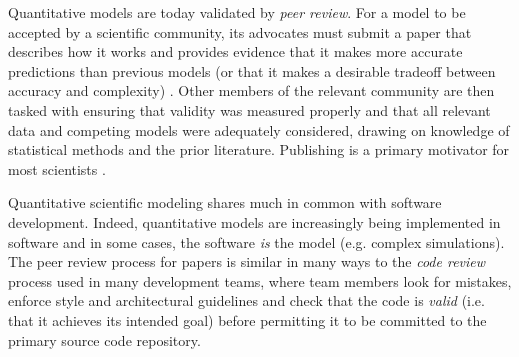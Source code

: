 \documentclass[9pt]{sig-alternate}
\begin{document}
Quantitative models are today validated by \emph{peer review}. For a model to be accepted by a scientific community, its advocates must submit a paper that describes how it works and provides evidence that it makes more accurate predictions than previous models (or that it makes a desirable tradeoff  between accuracy and complexity) \cite{box1987empirical}. Other members of the relevant community are then tasked with ensuring that validity was measured properly and that all relevant data and competing models were adequately considered, drawing on knowledge of statistical methods and the prior literature. Publishing is a primary motivator for most scientists \cite{howison2011scientific}.

Quantitative scientific modeling shares much in common with software development. Indeed, quantitative models are increasingly being implemented in software and in some cases, the software \emph{is} the model (e.g. complex simulations). The peer review process for papers is similar in many ways to the \emph{code review} process used in many development teams, where team members look for mistakes, enforce style and architectural guidelines and check that the code is \emph{valid} (i.e. that it achieves its intended goal) before permitting it to be committed to the primary source code repository. 
\end{document}
